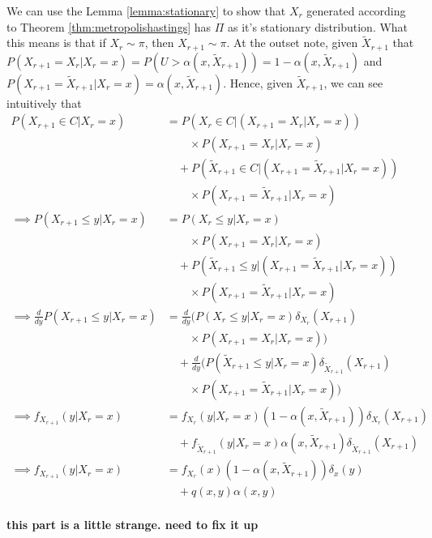 \documentclass[12pt, leqno]{article}
\begin{document}
We can use the Lemma \ref{lemma:stationary} to show that $X_r$
generated according to Theorem
\ref{thm:metropolishastings} has $\Pi$ as it's stationary
distribution. What this means is that if $X_r \sim \pi$, then $X_{r+1}
\sim \pi$. At the outset note, given $\tilde{X}_{r+1}$ that $P(X_{r+1} = X_r |X_{r} = x) = P(U >
\alpha(x,\tilde{X}_{r+1})) = 1 -
\alpha(x,\tilde{X}_{r+1})$ and $P(X_{r+1} = \tilde{X}_{r+1}|X_{r} = x) =
\alpha(x,\tilde{X}_{r+1})$. Hence, given $\tilde{X}_{r+1}$, we can see
intuitively that
\begin{align*}
P(X_{r+1} \in C|X_{r} = x) &= P(X_{r}
\in C|(X_{r+1} = X_r |X_{r} = x)) \\ &\qquad \times P(X_{r+1} = X_{r}|X_{r} = x) \\ &\quad + P(\tilde{X}_{r+1}
\in C|(X_{r+1} = \tilde{X}_{r+1} |X_{r} = x)) \\ &\qquad \times P(X_{r+1} = \tilde{X}_{r+1}|X_{r} = x) \\
\implies P(X_{r+1} \leq y |X_{r} = x) &= P(X_{r}
\leq y|X_r = x) \\ &\qquad \times P(X_{r+1} = X_{r}|X_{r} = x)  \\ &\quad + P(\tilde{X}_{r+1}
\leq y|(X_{r+1} = \tilde{X}_{r+1} |X_{r} = x)) \\ &\qquad \times P(X_{r+1} = \tilde{X}_{r+1}|X_{r} = x) \\
\implies \frac{d}{dy}P(X_{r+1} \leq y |X_{r} = x) &= \frac{d}{dy} (P(X_{r}
\leq y|X_r = x)  \delta_{{X}_{r}}(X_{r+1}) \\ &\qquad \times P(X_{r+1} = X_{r}|X_{r} = x))  \\
                           &\quad + \frac{d}{dy} (P(\tilde{X}_{r+1}
\leq y|X_{r} = x) \delta_{\tilde{X}_{r+1}}(X_{r+1})  \\ &\qquad \times P(X_{r+1} = \tilde{X}_{r+1}|X_{r} = x)) \\
\implies f_{X_{r+1}}(y |X_{r} = x) &= f_{X_{r}}(y|X_r = x) (1 -
\alpha(x,\tilde{X}_{r+1})) \delta_{{X}_{r}}(X_{r+1}) \\
                 &\quad + f_{\tilde{X}_{r+1}}(y|X_{r} = x)
                   \alpha(x,\tilde{X}_{r+1}) \delta_{\tilde{X}_{r+1}}(X_{r+1}) \\
\implies f_{X_{r+1}}(y |X_{r} = x) &= f_{X_r}(x)(1 -
\alpha(x,\tilde{X}_{r+1})) \delta_{x}(y)\\
                 &\quad + q(x,y) \alpha(x,y) \\
\end{align*}

\textbf{this part is a little strange. need to fix it up}
\end{document}
